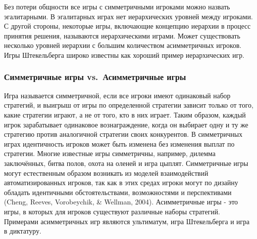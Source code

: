 Без потери общности все игры с симметричными игроками можно назвать
эгалитарными. В эгалитарных играх нет иерархических уровней между
игроками. С другой стороны, некоторые игры, включающие концепцию
иерархии в процесс принятия решения, называются иерархическими играми.
Может существовать несколько уровней иерархии с большим количеством
асимметричных игроков. Игры Штекельберга широко известны как хороший
пример иерархических игр.

\subsubsection{Симметричные игры vs.~Асимметричные
игры}

Игра называется симметричной, если все игроки имеют одинаковый набор
стратегий, и выигрыш от игры по определенной стратегии зависит только от
того, какие стратегии играют, а не от того, кто в них играет. Таким
образом, каждый игрок зарабатывает одинаковое вознаграждение, когда он
выбирает одну и ту же стратегию против аналогичной стратегии своих
конкурентов. В симметричных играх идентичность игроков может быть
изменена без изменения выплат по стратегии. Многие известные игры
симметричны, например, дилемма заключённых, битва полов, охота на оленей
и игра цыплят. Симметричные игры могут естественным образом возникать из
моделей взаимодействий автоматизированных игроков, так как в этих средах
игроки могут по дизайну обладать идентичными обстоятельствами,
возможностями и перспективами (Cheng, Reeves, Vorobeychik, \& Wellman,
2004). Асимметричные игры - это игры, в которых для игроков существуют
различные наборы стратегий. Примерами асимметричных игр являются
ультиматум, игра Штекельберга и игра в диктатуру.
